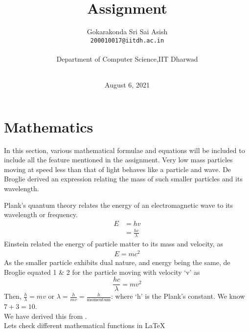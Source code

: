 \documentclass{article}
\begin{document}
\title{Assignment}
{\author{Gokarakonda Sri Sai Asish\\
\texttt{200010017@iitdh.ac.in}\\\\
Department of Computer Science,IIT Dharwad \\\\}}
\date{August 6, 2021}
\maketitle

\newpage %
\tableofcontents
\listoffigures
\listoftables

\newpage %


\section{Mathematics}
\label{sec :m} %
In this section, various mathematical formulae and equations will be included to include all the feature mentioned in the assignment. Very low mass particles moving at speed less than that of light behaves like a particle and wave. De Broglie derived an expression relating the mass of such smaller particles and its wavelength.

Plank's quantum theory relates the energy of an electromagnetic wave to its wavelength or frequency.
\vspace{4mm}
\begin{align}
E &= h v \nonumber \\
  &= \frac{hc}{\lambda}
\end{align}
Einstein related the energy of particle matter to its mass and velocity, as 
\begin{align}
	   E = m c^2
\end{align}
As the smaller particle exhibits dual nature, and energy being the same, de Broglie equated 1 \& 2 for the particle moving with velocity `v' as
$$\frac{hc}{\lambda} = m v^2$$ %
Then,           %
		$\frac{h}{\lambda} = mv $ or $\lambda = \frac{h}{mv} = \frac{h}{\text{momentum}}$: 
		where `h' is the Plank's constant. We know $7 + 3 = 10$.\\
We have derived this from \cite{verma2008concepts}.\\ %
Lets check different mathematical functions in \LaTeX
\end{document}
